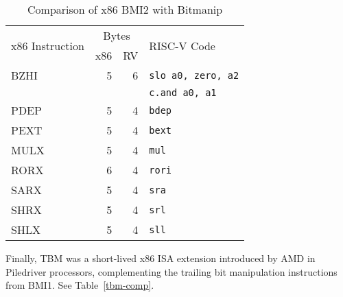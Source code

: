 \begin{table}[h]
\centering
\begin{tabular}{lrrl}
\multirow{2}{*}{x86 Instruction} & \multicolumn{2}{c}{Bytes} & \multirow{2}{*}{RISC-V Code} \\
& x86 & RV & \\
\hline
BZHI     & 5 &  6 & {\tt slo a0, zero, a2} \\
         &   &    & {\tt c.and a0, a1} \\
\hline
PDEP     & 5 &  4 & {\tt bdep} \\
\hline
PEXT     & 5 &  4 & {\tt bext} \\
\hline
MULX     & 5 &  4 & {\tt mul} \\
\hline
RORX     & 6 &  4 & {\tt rori} \\
\hline
SARX     & 5 &  4 & {\tt sra} \\
\hline
SHRX     & 5 &  4 & {\tt srl} \\
\hline
SHLX     & 5 &  4 & {\tt sll} \\
\end{tabular}
\caption{Comparison of x86 BMI2 with Bitmanip}
\label{bmi2-comp}
\end{table}

Finally, TBM was a short-lived x86 ISA extension introduced by AMD in
Piledriver processors, complementing the trailing bit manipulation instructions
from BMI1. See Table~\ref{tbm-comp}.

